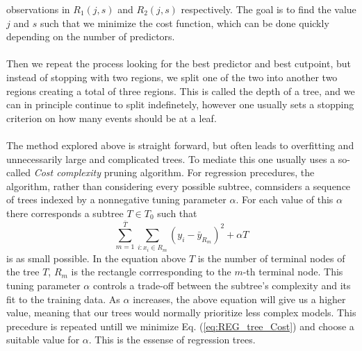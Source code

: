 \documentclass[12pt, a4paper]{book}
\begin{document}
observations in $R_1(j,s)$ and $R_2(j,s)$ respectively. The goal is to find the value $j$ and $s$ such that we minimize the cost function, which can be done quickly depending on the number of predictors.\\
\\Then we repeat the process looking for the best predictor and best cutpoint, but instead of stopping with two regions, we split one of the two into another two regions creating a total of three regions. This is called the depth of a tree, and we can in principle continue to split indefinetely, 
however one usually sets a stopping criterion on how many events should be at a leaf.\\
\\The method explored above is straight forward, but often leads to overfitting and unnecessarily large and complicated trees. To mediate this one usually uses a so-called \textit{Cost complexity} pruning algorithm. 
For regression precedures, the algorithm, rather than considering every possible subtree, comnsiders a sequence of trees indexed by a nonnegative tuning parameter $\alpha$. For each value of this $\alpha$ there corresponds a subtree $T\in T_0$ such that
\begin{equation}\label{eq:REG_tree_Cost}
    \sum_{m=1}^{\bar{T}}\sum_{i:x_i\in R_m}(y_i -\bar{y}_{R_m})^2 + \alpha T
\end{equation}
is as small possible. In the equation above $T$ is the number of terminal nodes of the tree $T$, $R_m$ is the rectangle corrresponding to the $m$-th terminal node. This tuning parameter $\alpha$ controls a trade-off between the subtree's complexity and its fit to the training data. 
As $\alpha$ increases, the above equation will give us a higher value, meaning that our trees would normally prioritize less complex models. This precedure is repeated untill we minimize Eq. (\ref{eq:REG_tree_Cost}) and choose a suitable value for $\alpha$. This is the essense of regression trees.
\end{document}
